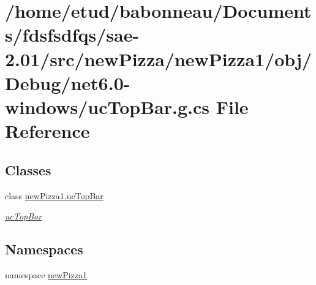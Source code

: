\hypertarget{Debug_2net6_80-windows_2ucTopBar_8g_8cs}{}\section{/home/etud/babonneau/\+Documents/fdsfsdfqs/sae-\/2.01/src/new\+Pizza/new\+Pizza1/obj/\+Debug/net6.0-\/windows/uc\+Top\+Bar.g.\+cs File Reference}
\label{Debug_2net6_80-windows_2ucTopBar_8g_8cs}
\subsection*{Classes}
\begin{DoxyCompactItemize}
\item 
class \hyperlink{classnewPizza1_1_1ucTopBar}{new\+Pizza1.\+uc\+Top\+Bar}
\begin{DoxyCompactList}\small\item\em \hyperlink{classnewPizza1_1_1ucTopBar}{uc\+Top\+Bar} \end{DoxyCompactList}\end{DoxyCompactItemize}
\subsection*{Namespaces}
\begin{DoxyCompactItemize}
\item 
namespace \hyperlink{namespacenewPizza1}{new\+Pizza1}
\end{DoxyCompactItemize}
